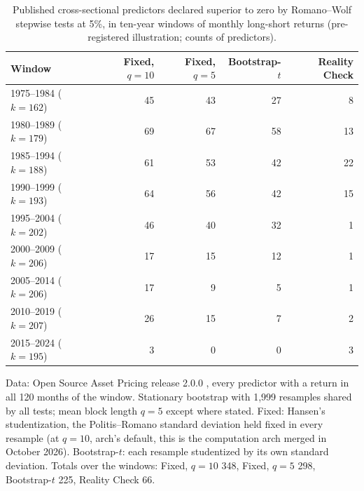 \begin{table}[t]
\centering
\small
\caption{Published cross-sectional predictors declared superior to zero by Romano--Wolf stepwise tests at 5\%, in ten-year windows of monthly long-short returns (pre-registered illustration; counts of predictors).}
\label{tab:anomalies}
\begin{tabular}{lrrrr}
\toprule
Window & Fixed, $q=10$ & Fixed, $q=5$ & Bootstrap-$t$ & Reality Check \\
\midrule
1975--1984 ($k=162$) & 45 & 43 & 27 & 8 \\
1980--1989 ($k=179$) & 69 & 67 & 58 & 13 \\
1985--1994 ($k=188$) & 61 & 53 & 42 & 22 \\
1990--1999 ($k=193$) & 64 & 56 & 42 & 15 \\
1995--2004 ($k=202$) & 46 & 40 & 32 & 1 \\
2000--2009 ($k=206$) & 17 & 15 & 12 & 1 \\
2005--2014 ($k=206$) & 17 & 9 & 5 & 1 \\
2010--2019 ($k=207$) & 26 & 15 & 7 & 2 \\
2015--2024 ($k=195$) & 3 & 0 & 0 & 3 \\
\bottomrule
\end{tabular}
\par\smallskip\begin{minipage}{0.97\linewidth}\footnotesize Data: Open Source Asset Pricing release 2.0.0 \citep{chen2022open}, every predictor with a return in all 120 months of the window. Stationary bootstrap with 1{,}999 resamples shared by all tests; mean block length $q=5$ except where stated. Fixed: Hansen's studentization, the Politis--Romano standard deviation held fixed in every resample (at $q=10$, arch's default, this is the computation arch merged in October 2026). Bootstrap-$t$: each resample studentized by its own standard deviation. Totals over the windows: Fixed, $q=10$ 348, Fixed, $q=5$ 298, Bootstrap-$t$ 225, Reality Check 66.\end{minipage}
\end{table}

